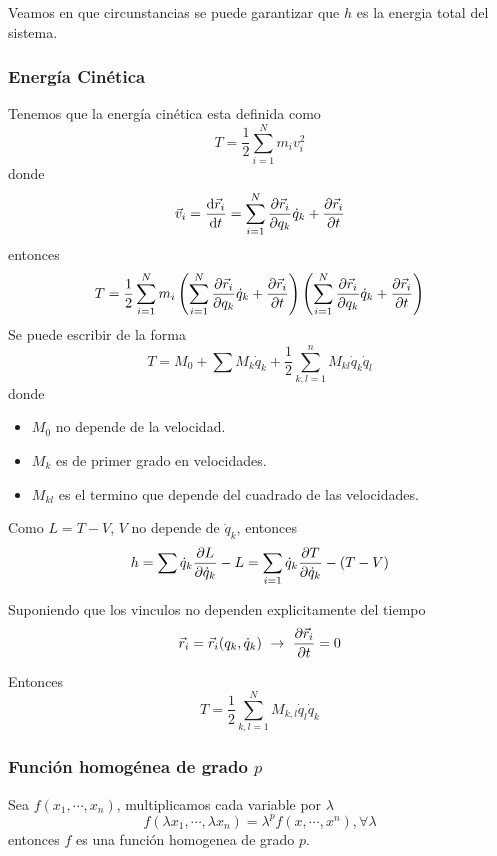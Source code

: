 \documentclass[../main]{subfiles}
\begin{document}
Veamos en que circunstancias se puede garantizar que $h$ es la energia total del sistema.

\subsubsection{Energía Cinética}
Tenemos que la energía cinética esta definida como 
\begin{equation}
    T=\dfrac{1}{2}\sum_{i=1}^N m_iv_i^2
\end{equation}
donde 
\begin{equation}
    \vec{v}_i=\dv{\vec{r}_i}{t}=\sum_{i=1}^N \pdv{\vec{r}_i}{q_k}\dot{q}_k+\pdv{\vec{r}_i}{t}
\end{equation}
entonces 
\begin{equation}
    T=\dfrac{1}{2}\sum_{i=1}^N m_i\left(\sum_{i=1}^N \pdv{\vec{r}_i}{q_k}\dot{q}_k+\pdv{\vec{r}_i}{t}\right)\left(\sum_{i=1}^N \pdv{\vec{r}_i}{q_k}\dot{q}_k+\pdv{\vec{r}_i}{t}\right)
\end{equation}
Se puede escribir de la forma
\begin{equation}
    T=M_0+\sum M_k \dot{q}_k+\dfrac{1}{2}\sum_{k, l=1}^n M_{kl}\dot{q}_k\dot{q}_l
\end{equation}
donde 
\begin{itemize}
    \item $M_0$ no depende de la velocidad.
    \item $M_k$ es de primer grado en velocidades.
    \item $M_{kl}$ es el termino que depende del cuadrado de las velocidades.
\end{itemize}

Como $L=T-V$, $V$ no depende de $\dot{q}_k$, entonces 
\begin{equation}
    h=\sum \dot{q}_k \pdv{L}{\dot{q}_k}-L=\sum_{i=1} \dot{q}_k \pdv{T}{\dot{q}_k}-(T-V)
\end{equation}

Suponiendo que los vinculos no dependen explicitamente del tiempo
\begin{equation}
    \vec{r}_i=\vec{r}_i(q_k, \dot{q}_k) \ \rightarrow \ \pdv{\vec{r}_i}{t}=0
\end{equation}

Entonces
\begin{equation}
    T=\dfrac{1}{2}\sum_{k, l=1}^N M_{k, l} \dot{q}_l \dot{q}_k
\end{equation}
\subsubsection{Función homogénea de grado $p$}
Sea $f(x_1, \cdots, x_n)$, multiplicamos cada variable por $\lambda$
\begin{equation}
    f(\lambda x_1, \cdots, \lambda x_n)=\lambda^p f(x, \cdots, x^n), \forall \lambda
\end{equation}
entonces $f$ es una función homogenea de grado $p$.
\end{document}
